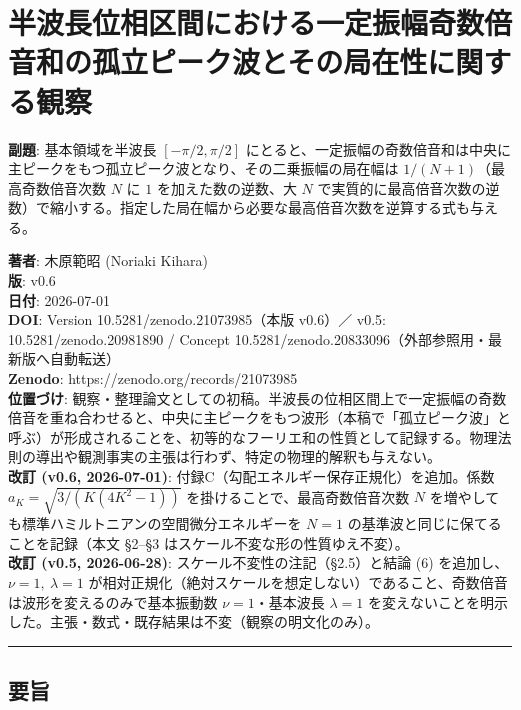 \documentclass[
]{ltjsarticle}
\author{}
\date{}
\begin{document}
\section{半波長位相区間における一定振幅奇数倍音和の孤立ピーク波とその局在性に関する観察}\label{ux534aux6ce2ux9577ux4f4dux76f8ux533aux9593ux306bux304aux3051ux308bux4e00ux5b9aux632fux5e45ux5947ux6570ux500dux97f3ux548cux306eux5b64ux7acbux30d4ux30fcux30afux6ce2ux3068ux305dux306eux5c40ux5728ux6027ux306bux95a2ux3059ux308bux89b3ux5bdf}

\textbf{副題}: 基本領域を半波長 \([-\pi/2,\pi/2]\)
にとると、一定振幅の奇数倍音和は中央に主ピークをもつ孤立ピーク波となり、その二乗振幅の局在幅は
\(1/(N+1)\)（最高奇数倍音次数 \(N\) に \(1\) を加えた数の逆数、大 \(N\)
で実質的に最高倍音次数の逆数）で縮小する。指定した局在幅から必要な最高倍音次数を逆算する式も与える。

\textbf{著者}: 木原範昭 (Noriaki Kihara)\\
\textbf{版}: v0.6\\
\textbf{日付}: 2026-07-01\\
\textbf{DOI}: Version 10.5281/zenodo.21073985（本版 v0.6）／ v0.5:
10.5281/zenodo.20981890 / Concept
10.5281/zenodo.20833096（外部参照用・最新版へ自動転送）\\
\textbf{Zenodo}: https://zenodo.org/records/21073985\\
\textbf{位置づけ}:
観察・整理論文としての初稿。半波長の位相区間上で一定振幅の奇数倍音を重ね合わせると、中央に主ピークをもつ波形（本稿で「孤立ピーク波」と呼ぶ）が形成されることを、初等的なフーリエ和の性質として記録する。物理法則の導出や観測事実の主張は行わず、特定の物理的解釈も与えない。\\
\textbf{改訂 (v0.6, 2026-07-01)}:
付録C（勾配エネルギー保存正規化）を追加。係数
\(a_K=\sqrt{3/(K(4K^2-1))}\) を掛けることで、最高奇数倍音次数 \(N\)
を増やしても標準ハミルトニアンの空間微分エネルギーを \(N=1\)
の基準波と同じに保てることを記録（本文 §2--§3
はスケール不変な形の性質ゆえ不変）。\\
\textbf{改訂 (v0.5, 2026-06-28)}: スケール不変性の注記（§2.5）と結論 (6)
を追加し、\(\nu=1,\ \lambda=1\)
が相対正規化（絶対スケールを想定しない）であること、奇数倍音は波形を変えるのみで基本振動数
\(\nu=1\)・基本波長 \(\lambda=1\)
を変えないことを明示した。主張・数式・既存結果は不変（観察の明文化のみ）。

\begin{center}\rule{0.5\linewidth}{0.5pt}\end{center}

\subsection{要旨}\label{ux8981ux65e8}
\end{document}
